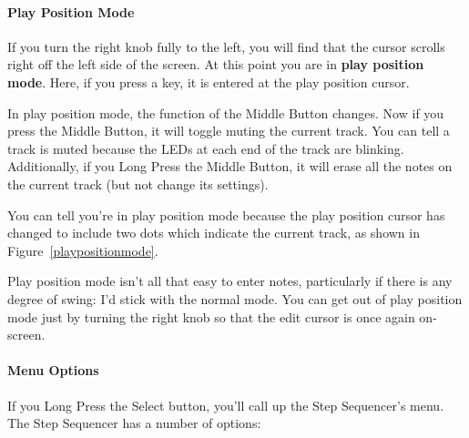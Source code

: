 \documentclass{article}
\begin{document}
\paragraph{Play Position Mode}

If you turn the right knob fully to the left, you will find that the cursor scrolls right off the left side of the screen.  At this point you are in {\bf play position mode}.  Here, if you press a key, it is entered at the play position cursor.

In play position mode, the function of the Middle Button changes.  Now if you press the Middle Button, it will toggle muting the current track.  You can tell a track is muted because the LEDs at each end of the track are blinking.  Additionally, if you Long Press the Middle Button, it will erase all the notes on the current track (but not change its settings).

You can tell you're in play position mode because the play position cursor has changed to include two dots which indicate the current track, as shown in Figure~\ref{playpositionmode}.

Play position mode isn't all that easy to enter notes, particularly if there is any degree of swing: I'd stick with the normal mode.  You can get out of play position mode just by turning the right knob so that the edit cursor is once again on-screen.

\paragraph{Menu Options}

If you Long Press the Select button, you'll call up the Step Sequencer's menu.  The Step Sequencer has a number of options:
\end{document}

